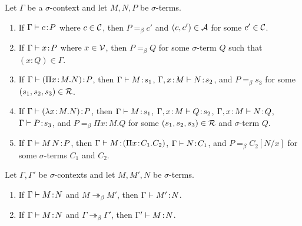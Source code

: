 \documentclass[reqno, twoside]{article}
\begin{document}
    \begin{lemma}\label{lem:stripping}
        Let $\Gamma$ be a $\sigma$-context and let $M,N,P$ be $\sigma$-terms.
        \begin{enumerate}
            \item If $\Gamma\vdash c\!:\!P$ where $c\in\mathcal{C}$, then $P=_\beta c'$ and $(c,c')\in\mathcal{A}$ for some $c'\in\mathcal{C}$.
                \vspace{-0.05in}
            \item If $\Gamma\vdash x\!:\!P$ where $x\in\mathcal{V}$, then $P=_\beta Q$ for some $\sigma$-term $Q$ such that $(x\!:\!Q)\in\Gamma$.
                \vspace{-0.05in}
            \item If $\Gamma\vdash(\Pi x\!:\!M.N)\!:\!P$, then $\Gamma\vdash M\!:\!s_1$, $\Gamma,x\!:\!M\vdash N\!:\!s_2$, and $P=_\beta s_3$ for some $(s_1,s_2,s_3)\in\mathcal{R}$.
                \vspace{-0.05in}
            \item If $\Gamma\vdash(\lambda x\!:\!M.N)\!:\!P$, then $\Gamma\vdash M\!:\!s_1$, $\Gamma,x\!:\!M\vdash Q\!:\!s_2$, $\Gamma,x\!:\!M\vdash N\!:\!Q$, $\Gamma\vdash P\!:\!s_3$, and $P=_\beta\Pi x\!:\! M.Q$ for some $(s_1,s_2,s_3)\in\mathcal{R}$ and $\sigma$-term $Q$.
                \vspace{-0.05in}
            \item If $\Gamma\vdash M\,N\!:\!P$, then $\Gamma\vdash M\!:\!(\Pi x\!:\!C_1.C_2)$, $\Gamma\vdash N\!:\!C_1$, and $P=_\beta C_2[N/x]$ for some $\sigma$-terms $C_1$ and $C_2$.
        \end{enumerate}
    \end{lemma}

    \begin{theorem}\label{thm:subject_reduction}
        Let $\Gamma,\Gamma'$ be $\sigma$-contexts and let $M,M',N$ be $\sigma$-terms.
        \begin{enumerate}
            \item If $\Gamma\vdash M\!:\!N$ and $M\twoheadrightarrow_\beta M'$, then $\Gamma\vdash M'\!:\! N$.
                \vspace{-0.05in}
            \item If $\Gamma\vdash M\!:\!N$ and $\Gamma\twoheadrightarrow_\beta\Gamma'$, then $\Gamma'\vdash M\!:\! N$.
        \end{enumerate}
    \end{theorem}
\end{document}
